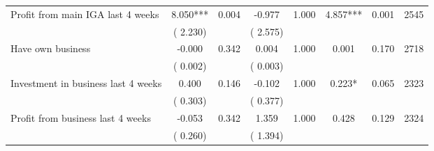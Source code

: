 \begin{tabular}{l*{7}{c}}
 Profit from main IGA last 4 weeks       &              8.050***       &        0.004  &             -0.977       &        1.000  &              4.857***       &              0.001 &  2545 \\ 
                       &       (       2.230)             &                               &       (       2.575)                     &                               &                                               &                                &                      \\ 

 Have own business       &             -0.000       &        0.342  &              0.004       &        1.000  &              0.001       &              0.170 &  2718 \\ 
                       &       (       0.002)             &                               &       (       0.003)                     &                               &                                               &                                &                      \\ 

 Investment in business last 4 weeks       &              0.400       &        0.146  &             -0.102       &        1.000  &              0.223*       &              0.065 &  2323 \\ 
                       &       (       0.303)             &                               &       (       0.377)                     &                               &                                               &                                &                      \\ 

 Profit from business last 4 weeks       &             -0.053       &        0.342  &              1.359       &        1.000  &              0.428       &              0.129 &  2324 \\ 
                       &       (       0.260)             &                               &       (       1.394)                     &                               &                                               &                                &                      \\ 

\hline \end{tabular}
